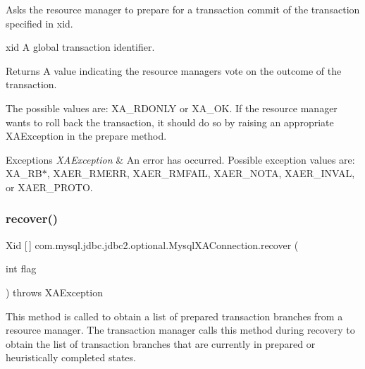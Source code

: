 Asks the resource manager to prepare for a transaction commit of the transaction specified in xid.

xid A global transaction identifier.

\begin{DoxyReturn}{Returns}
A value indicating the resource manager\textquotesingle{}s vote on the outcome of the transaction.
\end{DoxyReturn}
The possible values are\+: X\+A\+\_\+\+R\+D\+O\+N\+LY or X\+A\+\_\+\+OK. If the resource manager wants to roll back the transaction, it should do so by raising an appropriate X\+A\+Exception in the prepare method.


\begin{DoxyExceptions}{Exceptions}
{\em X\+A\+Exception} & An error has occurred. Possible exception values are\+: X\+A\+\_\+\+R\+B$\ast$, X\+A\+E\+R\+\_\+\+R\+M\+E\+RR, X\+A\+E\+R\+\_\+\+R\+M\+F\+A\+IL, X\+A\+E\+R\+\_\+\+N\+O\+TA, X\+A\+E\+R\+\_\+\+I\+N\+V\+AL, or X\+A\+E\+R\+\_\+\+P\+R\+O\+TO. \\
\hline
\end{DoxyExceptions}
\mbox{\label{classcom_1_1mysql_1_1jdbc_1_1jdbc2_1_1optional_1_1_mysql_x_a_connection_addc214698fd02360fd129159f4485e65}} 
\subsubsection{\texorpdfstring{recover()}{recover()}}
{\footnotesize\ttfamily Xid \mbox{[}$\,$\mbox{]} com.\+mysql.\+jdbc.\+jdbc2.\+optional.\+Mysql\+X\+A\+Connection.\+recover (\begin{DoxyParamCaption}\item[{int}]{flag }\end{DoxyParamCaption}) throws X\+A\+Exception}

This method is called to obtain a list of prepared transaction branches from a resource manager. The transaction manager calls this method during recovery to obtain the list of transaction branches that are currently in prepared or heuristically completed states.

